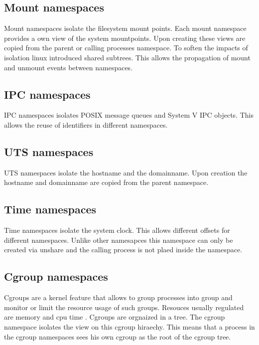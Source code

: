 \documentclass[10pt,twocolumn,a4paper]{article}
\begin{document}
\subsection{Mount namespaces}
Mount namespaces isolate the filesystem mount points. 
Each mount namespace provides a own view of the system mountpoints. 
Upon creating these views are copied from the parent or calling processes namespace.
To soften the impacts of isolation linux introduced shared subtrees. This allows the propagation of
mount and unmount events between namespaces.\cite{12}

\subsection{IPC namespaces}
IPC namespaces isolates POSIX message queues and System V IPC objects. This allows the reuse of identifiers
in different namespaces.\cite{13}

\subsection{UTS namespaces}
UTS namespaces isolate the hostname and the domainname. Upon creation the hostname and domainname are copied from the parent namespace.\cite{14}

\subsection{Time namespaces}
Time namespaces isolate the system clock. This allows different offsets for different namespaces.
Unlike other namesapces this namespace can only be created via unshare and the calling process is
not plaed inside the namespace.\cite{15}

\subsection{Cgroup namespaces}
Cgroups are a kernel feature that allows to group processes into group and monitor or limit the resource usage
of such groups. Resouces usually regulated are memory and cpu time \cite{16}. Cgroups are orgnaized
in a tree. The cgroup namespace isolates the view on this cgroup hiraechy. This means that a process
in the cgroup namespaces sees his own cgroup as the root of the cgroup tree. \cite{17}
\end{document}

